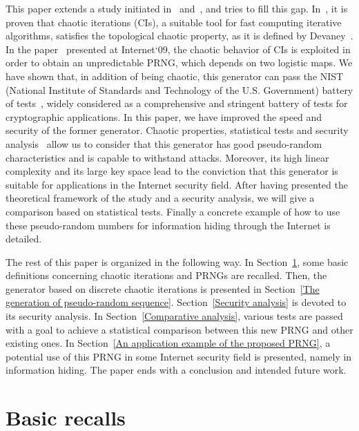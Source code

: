 \documentclass[10pt, a4paper, conference, compsocconf]{IEEEtran}
\begin{document}
This paper extends a study initiated in~\cite{guyeux09} and~\cite{wang2009}, and tries to fill this gap. In~\cite{guyeux09}, it is proven that chaotic iterations (CIs), a suitable tool for fast computing iterative algorithms, satisfies the topological chaotic property, as it is defined by Devaney~\cite{Dev89}.
In the paper~\cite{wang2009} presented at Internet`09, the chaotic behavior of CIs is exploited in order to obtain an unpredictable PRNG, which depends on two logistic maps.
We have shown that, in addition of being chaotic, this generator can pass the NIST (National Institute of Standards and Technology of the U.S. Government) battery of tests~\cite{ANDREW2008},
widely considered as a comprehensive and stringent battery of tests for cryptographic applications.
In this paper, we have improved the speed and security of the former generator.
Chaotic properties, statistical tests and security analysis~\cite{ZHENG92008} allow us to consider that this generator has good pseudo-random characteristics and is capable to withstand attacks.
Moreover, its high linear complexity and its large key space lead to the conviction that this generator is suitable for applications in the Internet security field. 
After having presented the theoretical framework of the study and a security analysis, we will give a comparison based on statistical tests. Finally a concrete example of how to use these pseudo-random numbers for information hiding through the Internet is detailed.


The rest of this paper is organized in the following way. In Section~\ref{Basic recalls}, some basic definitions concerning chaotic iterations and PRNGs are recalled. Then, the generator based on discrete chaotic iterations is presented in Section~\ref{The generation of pseudo-random sequence}. Section~\ref{Security analysis} is devoted to its security analysis. In Section~\ref{Comparative analysis}, various tests are passed with a goal to achieve a statistical comparison between this new PRNG and other existing ones. In Section~\ref{An application example of the proposed PRNG}, a potential use of this PRNG in some Internet security field is presented, namely in information hiding. The paper ends with a conclusion and intended future work. 


\section{Basic recalls}
\label{Basic recalls}
\end{document}
